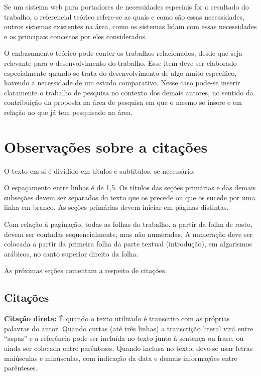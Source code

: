 Se um sistema web para portadores de necessidades especiais for o resultado do trabalho, o referencial teórico refere-se as quais e como são essas necessidades, outros sistemas existentes na área, como os sistemas lidam com essas necessidades e os principais conceitos por eles considerados.

O embasamento teórico pode conter os trabalhos relacionados, desde que seja relevante para o desenvolvimento do trabalho. Esse item deve ser elaborado especialmente quando se trata do desenvolvimento de algo muito específico, havendo a necessidade de um estudo comparativo. Nesse caso pode-se inserir claramente o trabalho de pesquisa no contexto dos demais autores, no sentido da contribuição da proposta na área de pesquisa em que o mesmo se insere e em relação ao que já tem pesquisado na área. 


\section{Observações sobre a citações}\label{sec:formatacaoTexto}

O texto em si é dividido em títulos e subtítulos, se necessário. 

O espaçamento entre linhas é de 1,5. Os títulos das seções primárias e das demais subseções devem ser separados do texto que os precede ou que os sucede por uma linha em branco. As seções primárias devem iniciar em páginas distintas.

Com relação à paginação, todas as folhas do trabalho, a partir da folha de rosto, devem ser contadas sequencialmente, mas não numeradas. A numeração deve ser colocada a partir da primeira folha da parte textual (introdução), em algarismos arábicos, no canto superior direito da folha.


As próximas seções comentam a respeito de citações.

\subsection{Citações}\label{subsec:citacoes}

\textbf{Citação direta:} É quando o texto utilizado é transcrito com as próprias palavras do autor. Quando curtas (até três linhas) a transcrição literal virá entre “aspas” e a referência pode ser incluída no texto junto à sentença ou frase, ou ainda ser colocada entre parênteses. Quando inclusa no texto, deve-se usar letras maiúsculas e minúsculas, com indicação da data e demais informações entre parênteses.

